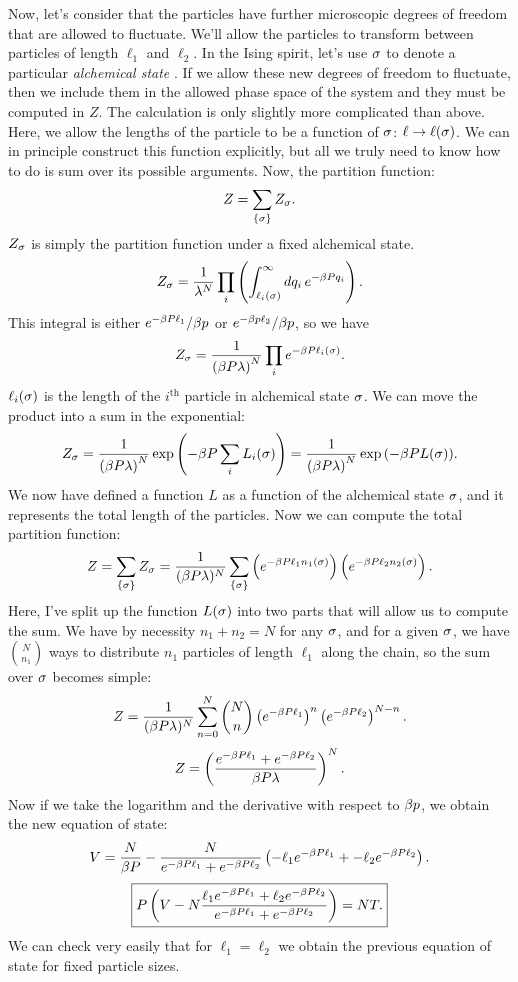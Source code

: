 \documentclass[12pt]{article}
\begin{document}
Now, let's consider that the particles have further microscopic degrees of freedom that are allowed to fluctuate. We'll allow the particles to transform between particles of length $\ell_1$ and $\ell_2$. In the Ising spirit, let's use $\sigma$ to denote a particular \emph{alchemical state} . If we allow these new degrees of freedom to fluctuate, then we include them in the allowed phase space of the system and they must be computed in $Z$. The calculation is only slightly more complicated than above. Here, we allow the lengths of the particle to be a function of $\sigma$: $\ell \rightarrow \ell(\sigma)$. We can in principle construct this function explicitly, but all we truly need to know how to do is sum over its possible arguments. Now, the partition function:
\[ Z = \sum_{\{\sigma\}} Z_\sigma.\]
$Z_\sigma$ is simply the partition function under a fixed alchemical state.
\[ Z_\sigma = \frac{1}{\lambda^N}\prod_i \left(\int_{\ell_i(\sigma)}^\infty dq_i\, e^{-\beta P q_i}\right).\]
This integral is either $e^{-\beta P \ell_1}/\beta p$ or $e^{-\beta p \ell_2}/\beta p$, so we have
\[ Z_\sigma = \frac{1}{\left(\beta P \lambda\right)^N} \prod_i e^{-\beta P\ell_i(\sigma)}.\]
$\ell_i(\sigma)$ is the length of the $i^\mathrm{th}$ particle in alchemical state $\sigma$. We can move the product into a sum in the exponential:
\[ Z_\sigma = \frac{1}{\left(\beta P \lambda\right)^N} \exp\left(-\beta P \sum_i L_i(\sigma)\right) = \frac{1}{\left(\beta P \lambda\right)^N} \exp{\left(-\beta P L(\sigma)\right)}.\]
We now have defined a function $L$ as a function of the alchemical state $\sigma$, and it represents the total length of the particles. Now we can compute the total partition function:
\[ Z = \sum_{\{ \sigma \} } Z_\sigma = \frac{1}{(\beta P \lambda)^N} \sum_{\{ \sigma \} } \left(e^{-\beta P \ell_1 n_1(\sigma)}\right)\left(e^{-\beta P \ell_2 n_2(\sigma)}\right).\]
Here, I've split up the function $L(\sigma)$ into two parts that will allow us to compute the sum. We have by necessity $n_1+n_2 = N$ for any $\sigma$, and for a given $\sigma$, we have $ N \choose {n_1}$ ways to distribute $n_1$ particles of length $\ell_1$ along the chain, so the sum over $\sigma$ becomes simple:
\[ Z = \frac{1}{(\beta P \lambda)^N} \sum_{n=0}^N {N \choose n} \left(e^{-\beta P \ell_1}\right)^{n}\left(e^{-\beta P \ell_2}\right)^{N-n}.\]
\[ Z = \left(\frac{e^{-\beta P \ell_1} + e^{-\beta P \ell_2}}{\beta P \lambda}\right)^N.\]
Now if we take the logarithm and the derivative with respect to $\beta p$, we obtain the new equation of state:
\[ V = \frac{N}{\beta P} - \frac{N}{e^{-\beta P \ell_1} + e^{-\beta P \ell_2}}\left(-\ell_1e^{-\beta P \ell_1} + -\ell_2e^{-\beta P \ell_2}\right).\]
\[ \boxed{ P\left(V - N\frac{\ell_1 e^{-\beta P \ell_1} + \ell_2e^{-\beta P \ell_2}}{e^{-\beta P \ell_1} + e^{-\beta P \ell_2}}\right) = N T.}\]
We can check very easily that for $\ell_1 = \ell_2$ we obtain the previous equation of state for fixed particle sizes.
\end{document}
